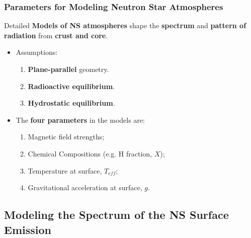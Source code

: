 \begin{frame}
\frametitle{Parameters for Modeling Neutron Star Atmospheres}

\begin{center}
 

	Detailed {\bf Models of NS atmospheres} shape the {\bf spectrum } and {\bf pattern of radiation} from {\bf crust and core}. 


\end{center}

	\begin{itemize}

	\item 
Assumptions:
\begin{enumerate}
 \item {\bf Plane-parallel} geometry.
 \item {\bf Radioactive equilibrium}.
 \item {\bf Hydrostatic equilibrium}.
\end{enumerate}
\quad

	 \item The {\bf four parameters} in the models are:
	   \begin{enumerate}
	    \item Magnetic field strengths;
	    \item Chemical Compositions (e.g. H fraction, $X$);
	    \item Temperature at surface, $T_{eff}$;
	    \item Gravitational acceleration at surface, $g$.
	   \end{enumerate}
	\end{itemize}	   
\end{frame}







\subsection*{Modeling the Spectrum of the  NS Surface Emission}



